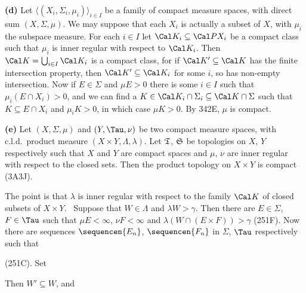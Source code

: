 {\medskip

{\bf (d)} Let $\langle(X_i,\Sigma_i,\mu_i)\rangle_{i\in I}$ be a family
of compact measure spaces, with direct sum $(X,\Sigma,\mu)$.   We may
suppose that each $X_i$ is actually a subset of $X$, with $\mu_i$ the
subspace measure.   For each $i\in I$ let $\Cal K_i\subseteq\Cal PX_i$
be a compact class such that $\mu_i$ is inner regular with respect to
$\Cal K_i$.   Then $\Cal K=\bigcup_{i\in I}\Cal K_i$ is a compact class,
for if $\Cal K'\subseteq\Cal K$ has the finite intersection property,
then $\Cal K'\subseteq\Cal K_i$ for some $i$, so has non-empty
intersection.   Now if
$E\in\Sigma$ and $\mu E>0$ there is some $i\in I$ such that
$\mu_i(E\cap X_i)>0$, and we can find a
$K\in\Cal K_i\cap\Sigma_i\subseteq\Cal K\cap\Sigma$ such that
$K\subseteq E\cap X_i$ and $\mu_iK>0$, in which
case $\mu K>0$.   By 342E, $\mu$ is compact.

\medskip

{\bf (e)} Let $(X,\Sigma,\mu)$ and $(Y,\Tau,\nu)$ be two compact measure
spaces, with c.l.d.\ product measure $(X\times Y,\Lambda,\lambda)$.
Let $\frak T$, $\frak S$ be topologies on $X$, $Y$ respectively such
that $X$
and $Y$ are compact spaces and $\mu$, $\nu$ are inner regular with
respect to the closed sets.   Then the product topology on $X\times Y$
is compact (3A3J).

The point is that $\lambda$ is inner regular with respect to the family
$\Cal K$ of closed subsets of $X\times Y$.   \Prf\ Suppose that
$W\in\Lambda$ and $\lambda W>\gamma$.   Then there are $E\in\Sigma$,
$F\in\Tau$ such that $\mu E<\infty$, $\nu F<\infty$ and
$\lambda(W\cap(E\times F))>\gamma$ (251F).   Now
there are sequences $\sequencen{E_n}$, $\sequencen{F_n}$ in $\Sigma$,
$\Tau$ respectively such that



\noindent (251C).   Set


\noindent Then $W'\subseteq W$, and


}
